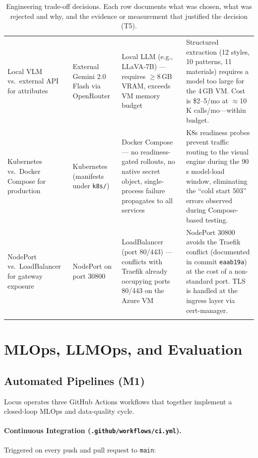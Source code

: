 \documentclass[12pt]{article}
\begin{document}
\begin{longtable}{@{}p{2.8cm}p{2.8cm}p{3.2cm}p{4.2cm}@{}}
Local VLM vs.\ external API for attributes &
External Gemini 2.0 Flash via OpenRouter &
Local LLM (e.g., LLaVA-7B) --- requires $\ge$8\,GB VRAM, exceeds VM memory budget &
Structured extraction (12 styles, 10 patterns, 11 materials) requires a model too large for the 4\,GB VM. Cost is \$2--5/mo at $\approx$10\,K calls/mo---within budget. \\[4pt]

Kubernetes vs.\ Docker Compose for production &
Kubernetes (manifests under \texttt{k8s/}) &
Docker Compose --- no readiness-gated rollouts, no native secret object, single-process failure propagates to all services &
K8s readiness probes prevent traffic routing to the visual engine during the 90\,s model-load window, eliminating the ``cold start 503'' errors observed during Compose-based testing. \\[4pt]

NodePort vs.\ LoadBalancer for gateway exposure &
NodePort on port 30800 &
LoadBalancer (port 80/443) --- conflicts with Traefik already occupying ports 80/443 on the Azure VM &
NodePort 30800 avoids the Traefik conflict (documented in commit \texttt{eaab19a}) at the cost of a non-standard port. TLS is handled at the ingress layer via cert-manager. \\ \bottomrule

\caption{Engineering trade-off decisions. Each row documents what was chosen, what was rejected and why, and the evidence or measurement that justified the decision (T5).}
\label{tab:tradeoffs}
\end{longtable}

\section{MLOps, LLMOps, and Evaluation}

\subsection{Automated Pipelines (M1)}

Locus operates three GitHub Actions workflows that together implement a closed-loop MLOps and data-quality cycle.

\paragraph{Continuous Integration (\texttt{.github/workflows/ci.yml}).}
Triggered on every push and pull request to \texttt{main}:
\end{document}
